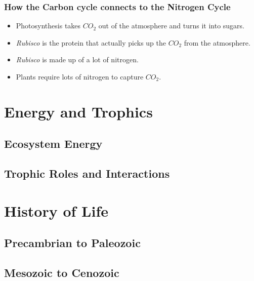 \documentclass[12pt]{article}
\begin{document}
\subsubsection{How the Carbon cycle connects to the Nitrogen Cycle}

\begin{itemize}
    \item Photosynthesis takes $CO_2$ out of the atmosphere and turns it into sugars.
    \item \textit{Rubisco} is the protein that actually picks up the $CO_2$ from the atmosphere.
    \item \textit{Rubisco} is made up of a lot of nitrogen.
    \item Plants require lots of nitrogen to capture $CO_2$.
\end{itemize}


\section{Energy and Trophics}

\subsection{Ecosystem Energy}

\subsection{Trophic Roles and Interactions}


\section{History of Life}

\subsection{Precambrian to Paleozoic}

\subsection{Mesozoic to Cenozoic}
\end{document}
